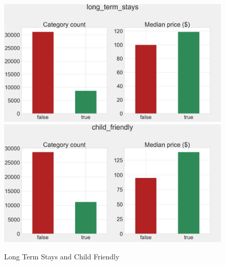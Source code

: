 \begin{figure}[H]
    \centering
    \caption{Long Term Stays and Child Friendly}
    \includegraphics[width=\linewidth]{figures/amenities/group1/long_term_stays.png}
    \vspace{0.5cm}
    \includegraphics[width=\linewidth]{figures/amenities/group1/child_friendly.png}
    \label{fig:long-term-stays-and-child-friendly}
\end{figure}

